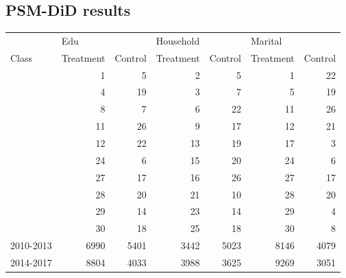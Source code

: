 \documentclass{mcmthesis}
\begin{document}
\begin{appendices}
\section{PSM-DiD results}
\begin{table}[htbp]
  \centering

    \begin{tabular}{lrrrrrr}
          & \multicolumn{1}{l}{Edu} &       & \multicolumn{1}{l}{Household} &       & \multicolumn{1}{l}{Marital} &  \\
    Class & \multicolumn{1}{l}{Treatment} & \multicolumn{1}{l}{Control} & \multicolumn{1}{l}{Treatment} & \multicolumn{1}{l}{Control} & \multicolumn{1}{l}{Treatment} & \multicolumn{1}{l}{Control} \\
          & 1     & 5     & 2     & 5     & 1     & 22 \\
          & 4     & 19    & 3     & 7     & 5     & 19 \\
          & 8     & 7     & 6     & 22    & 11    & 26 \\
          & 11    & 26    & 9     & 17    & 12    & 21 \\
          & 12    & 22    & 13    & 19    & 17    & 3 \\
          & 24    & 6     & 15    & 20    & 24    & 6 \\
          & 27    & 17    & 16    & 26    & 27    & 17 \\
          & 28    & 20    & 21    & 10    & 28    & 20 \\
          & 29    & 14    & 23    & 14    & 29    & 4 \\
          & 30    & 18    & 25    & 18    & 30    & 8 \\
    2010-2013 & 6990  & 5401  & 3442  & 5023  & 8146  & 4079 \\
    2014-2017 & 8804  & 4033  & 3988  & 3625  & 9269  & 3051 \\
    \end{tabular}%
  \label{tab:addlabel}%
\end{table}%
\begin{table}[htbp]
  \centering


\end{table}
\end{appendices}
\end{document}
